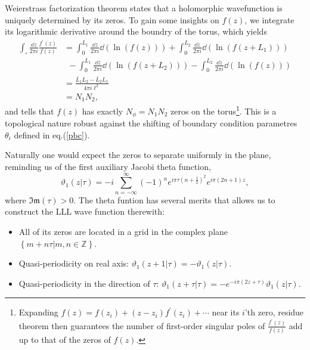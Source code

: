 \documentclass[%
nofootinbib,
 amsmath,amssymb,
 aps,onecolumn,
prb
]{revtex4-2}
\begin{document}
Weierstrass factorization theorem states that a holomorphic wavefunction is uniquely determined by its zeros\cite{wiki:Weierstrass,JieWangPhdThesis}. To gain some insights on $f\left(z\right)$, we integrate its logarithmic derivative around the boundry of the torus, which yields 
\begin{align}
    \int_{\square}\frac{\dd z}{2\pi i}\frac{f^\prime\left(z\right)}{f\left(z\right)}&=\int_{0}^{L_1}\frac{\dd z}{2\pi i}\dd\left(\ln\left(f\left(z\right)\right)\right)
    +\int_{0}^{L_2}\frac{\dd z}{2\pi i}\dd\left(\ln\left(f\left(z+L_1\right)\right)\right)\nonumber\\ 
    &\ \ -\int_{0}^{L_1}\frac{\dd z}{2\pi i}\dd\left(\ln\left(f\left(z+L_2\right)\right)\right)-\int_{0}^{L_2}\frac{\dd z}{2\pi i}\dd\left(\ln\left(f\left(z\right)\right)\right)\nonumber\\ 
    &=\frac{\bar{L}_1L_2-\bar{L}_2L_1}{4\pi i\ell^2}\nonumber\\
    &=N_1N_2,
\end{align}
and tells that $f\left(z\right)$ has exactly $N_\phi=N_1N_2$ zeros on the torus\footnote{Expanding $f\left(z\right)=f\left(z_i\right)+\left(z-z_i\right)f^\prime\left(z_i\right)+\cdots$ near its $i$'th zero, residue theorem then guarantees 
the number of first-order singular poles of $\frac{f^\prime\left(z\right)}{f\left(z\right)}$ add up to that of the zeros of $f\left(z\right)$.}. This is a topological nature robust against the shifting of boundary condition parametres $\theta_i$
defined in eq.(\ref{pbc}). \par 

Naturally one would expect the zeros to separate uniformly in the plane, reminding us of the first auxiliary Jacobi theta function\cite{Haldane1985PrbPeriodic},
\begin{equation}
    \vartheta_1(z|\tau)=-i\sum_{n=-\infty}^{\infty}(-1)^n e^{i\pi\tau(n+\frac{1}{2})^2}e^{i\pi(2n+1)z},
\end{equation}
where $\mathfrak{Im}(\tau)>0$. The theta funtion has several merits that allows us to construct the LLL wave function therewith:
\begin{itemize}
    \item All of its zeros are located in a grid in the complex plane $\left\{ m+ n\tau \vert m,n\in\mathbb{Z} \right\}$.
    \item Quasi-periodicity on real axis: $\vartheta_1(z+1|\tau)=-\vartheta_1(z|\tau)$.
    \item Quasi-periodicity in the direction of $\tau$: $\vartheta_1(z+\tau|\tau)=-e^{-i\pi(2z+\tau)}\vartheta_1(z|\tau)$.
\end{itemize}
\end{document}
